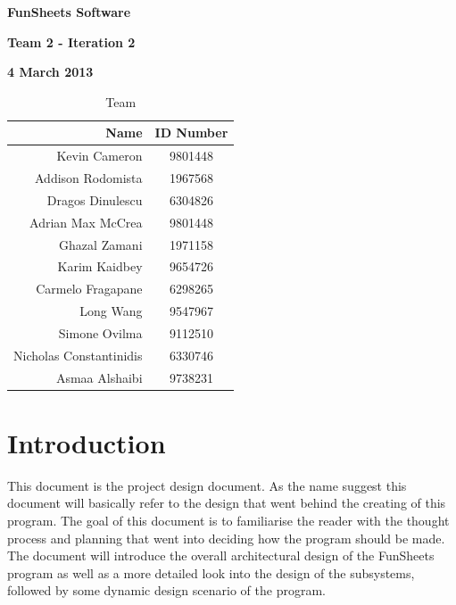 \documentclass[12pt]{article}
\begin{document}
\vspace*{0.5in}
\centerline{\bf\Large FunSheets Software}

\vspace*{0.5in}
\centerline{\bf\Large Team 2 - Iteration 2}

\vspace*{0.5in}
\centerline{\bf\Large 4 March 2013}

\vspace*{1.5in}
\begin{table}[htbp]
\caption{Team}
\begin{center}
\begin{tabular}{|r | c|}
\hline
Name & ID Number \\\hline\hline
Kevin Cameron & 9801448 \\\hline\hline
Addison Rodomista & 1967568 \\\hline\hline
Dragos Dinulescu & 6304826 \\\hline\hline
Adrian Max McCrea & 9801448 \\\hline\hline
Ghazal Zamani & 1971158 \\\hline\hline
Karim Kaidbey & 9654726 \\\hline\hline
Carmelo Fragapane & 6298265 \\\hline\hline
Long Wang & 9547967 \\\hline\hline
Simone Ovilma & 9112510 \\\hline\hline
Nicholas Constantinidis & 6330746 \\\hline\hline
Asmaa Alshaibi & 9738231 \\\hline
\end{tabular}
\end{center}
\end{table}

\clearpage

\section{Introduction}
This document is the project design document. As the name suggest this document will basically refer to the design that went behind the creating of this program. The goal of this document is to familiarise the reader with the thought process and planning that went into deciding how the program should be made. The document will introduce the overall architectural design of the FunSheets program as well as a more detailed look into the design of the subsystems, followed by some dynamic design scenario of the program.
\end{document}
